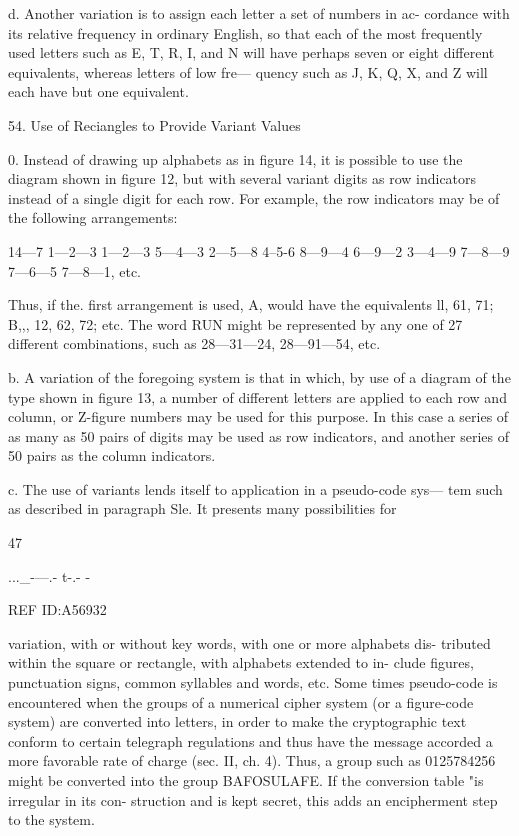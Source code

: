 d. Another variation is to assign each letter a set of numbers in ac-
cordance with its relative frequency in ordinary English, so that each of
the most frequently used letters such as E, T, R, I, and N will have
perhaps seven or eight different equivalents, whereas letters of low fre—
quency such as J, K, Q, X, and Z will each have but one equivalent.

54. Use of Reciangles to Provide Variant Values

0. Instead of drawing up alphabets as in ﬁgure 14, it is possible to use
the diagram shown in ﬁgure 12, but with several variant digits as row
indicators instead of a single digit for each row. For example, the row
indicators may be of the following arrangements:

14—7 1—2—3 1—2—3 5—4—3
2—5—8 4--5-6 8—9—4 6—9—2
3—4—9 7—8—9 7—6—5 7—8—1, etc.

Thus, if the. ﬁrst arrangement is used, A, would have the equivalents ll,
61, 71; B,,, 12, 62, 72; etc. The word RUN might be represented by
any one of 27 different combinations, such as 28—31—24, 28—91—54, etc.

b. A variation of the foregoing system is that in which, by use of a
diagram of the type shown in ﬁgure 13, a number of different letters are
applied to each row and column, or Z-ﬁgure numbers may be used for
this purpose. In this case a series of as many as 50 pairs of digits may be
used as row indicators, and another series of 50 pairs as the column
indicators.

c. The use of variants lends itself to application in a pseudo-code sys—
tem such as described in paragraph Sle. It presents many possibilities for

47

 

..._-—.- t-.- -

REF ID:A56932

variation, with or without key words, with one or more alphabets dis-
tributed within the square or rectangle, with alphabets extended to in-
clude ﬁgures, punctuation signs, common syllables and words, etc. Some
times pseudo-code is encountered when the groups of a numerical cipher
system (or a ﬁgure-code system) are converted into letters, in order to
make the cryptographic text conform to certain telegraph regulations
and thus have the message accorded a more favorable rate of charge (sec.
II, ch. 4). Thus, a group such as 0125784256 might be converted into the
group BAFOSULAFE. If the conversion table "is irregular in its con-
struction and is kept secret, this adds an encipherment step to the system.

